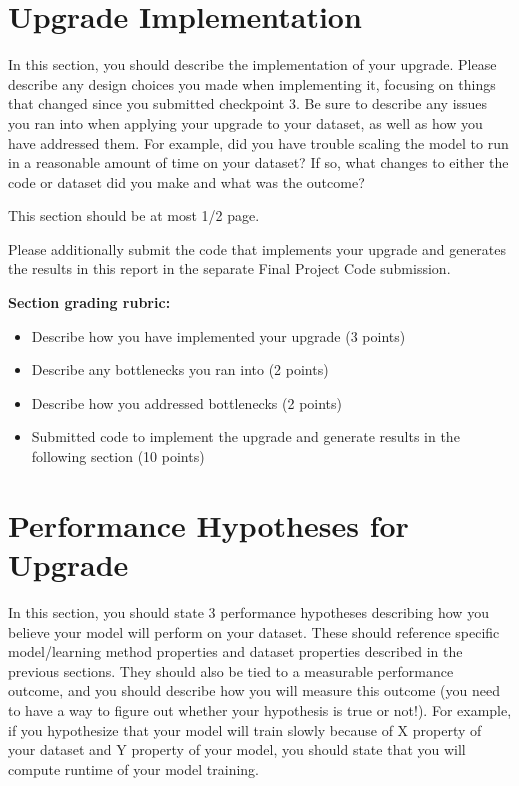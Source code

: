 \documentclass[12pt]{article}
\begin{document}
\section{Upgrade Implementation}

In this section, you should describe the implementation of your upgrade.  Please describe any design choices you made when implementing it, focusing on things that changed since you submitted checkpoint 3.  Be sure to describe any issues you ran into when applying your upgrade to your dataset, as well as how you have addressed them.  For example, did you have trouble scaling the model to run in a reasonable amount of time on your dataset?  If so, what changes to either the code or dataset did you make and what was the outcome?

This section should be at most 1/2 page.

Please additionally submit the code that implements your upgrade and generates the results in this report in the separate Final Project Code submission.

\textbf{Section grading rubric:}
\begin{itemize}
	\item Describe how you have implemented your upgrade (3 points)
	\item Describe any bottlenecks you ran into (2 points)
	\item Describe how you addressed bottlenecks (2 points)
	\item Submitted code to implement the upgrade and generate results in the following section (10 points)
\end{itemize}

\section{Performance Hypotheses for Upgrade}

In this section, you should state 3 performance hypotheses describing how you believe your model will perform on your dataset.  These should reference specific model/learning method properties and dataset properties described in the previous sections.  They should also be tied to a measurable performance outcome, and you should describe how you will measure this outcome (you need to have a way to figure out whether your hypothesis is true or not!).  For example, if you hypothesize that your model will train slowly because of X property of your dataset and Y property of your model, you should state that you will compute runtime of your model training.  
\end{document}
